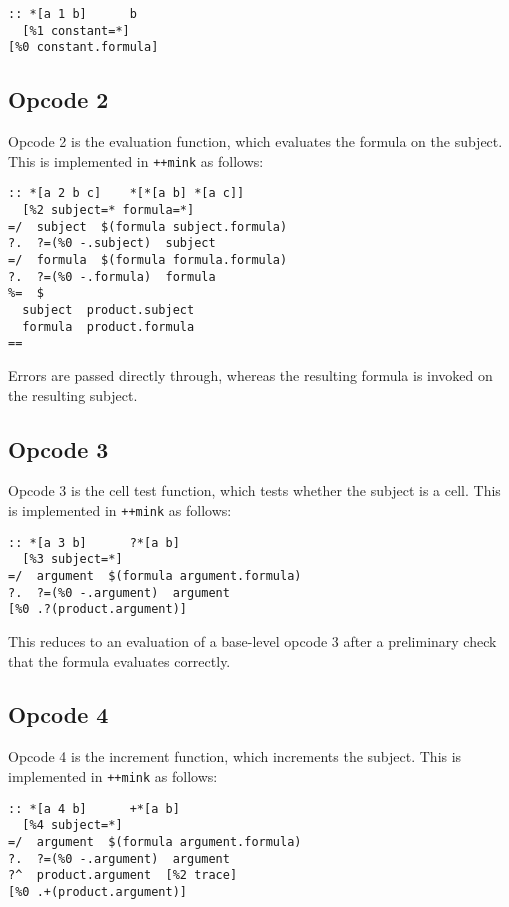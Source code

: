\documentclass[twoside]{article}
\begin{document}
\begin{lstlisting}[style=listingcode]
:: *[a 1 b]      b
  [%1 constant=*]
[%0 constant.formula]
\end{lstlisting}

\subsection{Opcode 2}

Opcode 2 is the evaluation function, which evaluates the formula on the subject.  This is implemented in \lstinline[style=inlinecode]{++mink} as follows:

\begin{lstlisting}[style=listingcode]
:: *[a 2 b c]    *[*[a b] *[a c]]
  [%2 subject=* formula=*]
=/  subject  $(formula subject.formula)
?.  ?=(%0 -.subject)  subject
=/  formula  $(formula formula.formula)
?.  ?=(%0 -.formula)  formula
%=  $
  subject  product.subject
  formula  product.formula
==
\end{lstlisting}

\noindent
Errors are passed directly through, whereas the resulting formula is invoked on the resulting subject.

\subsection{Opcode 3}

Opcode 3 is the cell test function, which tests whether the subject is a cell.  This is implemented in \lstinline[style=inlinecode]{++mink} as follows:

\begin{lstlisting}[style=listingcode]
:: *[a 3 b]      ?*[a b]
  [%3 subject=*]
=/  argument  $(formula argument.formula)
?.  ?=(%0 -.argument)  argument
[%0 .?(product.argument)]
\end{lstlisting}

\noindent
This reduces to an evaluation of a base-level opcode 3 after a preliminary check that the formula evaluates correctly.

\subsection{Opcode 4}

Opcode 4 is the increment function, which increments the subject.  This is implemented in \lstinline[style=inlinecode]{++mink} as follows:

\begin{lstlisting}[style=listingcode]
:: *[a 4 b]      +*[a b]
  [%4 subject=*]
=/  argument  $(formula argument.formula)
?.  ?=(%0 -.argument)  argument
?^  product.argument  [%2 trace]
[%0 .+(product.argument)]
\end{lstlisting}
\end{document}
